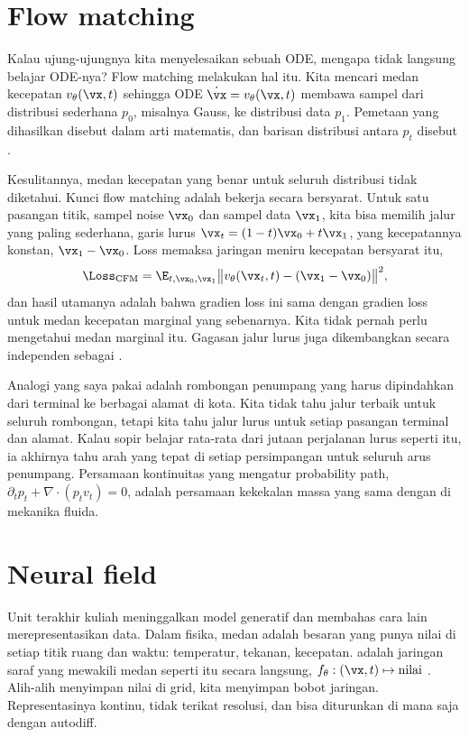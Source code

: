 \section{Flow matching}

Kalau ujung-ujungnya kita menyelesaikan sebuah ODE, mengapa tidak langsung belajar ODE-nya?
Flow matching \citep{lipman2023} melakukan hal itu. Kita mencari medan kecepatan $v_\theta(\vx,t)$
sehingga ODE $\dot{\vx}=v_\theta(\vx,t)$ membawa sampel dari distribusi sederhana $p_0$, misalnya
Gauss, ke distribusi data $p_1$. Pemetaan yang dihasilkan disebut  dalam arti
matematis, dan barisan distribusi antara $p_t$ disebut .

Kesulitannya, medan kecepatan yang benar untuk seluruh distribusi tidak diketahui. Kunci flow
matching adalah bekerja secara bersyarat. Untuk satu pasangan titik, sampel noise $\vx_0$ dan sampel
data $\vx_1$, kita bisa memilih jalur yang paling sederhana, garis lurus
$\vx_t=(1-t)\vx_0+t\vx_1$, yang kecepatannya konstan, $\vx_1-\vx_0$. Loss  memaksa jaringan meniru kecepatan bersyarat itu,
\begin{equation}
\Loss_{\mathrm{CFM}}=\E_{t,\vx_0,\vx_1}\big\|v_\theta(\vx_t,t)-(\vx_1-\vx_0)\big\|^2,
\end{equation}
dan hasil utamanya adalah bahwa gradien loss ini sama dengan gradien loss untuk medan kecepatan
marginal yang sebenarnya. Kita tidak pernah perlu mengetahui medan marginal itu. Gagasan jalur lurus
juga dikembangkan secara independen sebagai  \citep{liu2023}.

Analogi yang saya pakai adalah rombongan penumpang yang harus dipindahkan dari terminal ke berbagai
alamat di kota. Kita tidak tahu jalur terbaik untuk seluruh rombongan, tetapi kita tahu jalur lurus
untuk setiap pasangan terminal dan alamat. Kalau sopir belajar rata-rata dari jutaan perjalanan
lurus seperti itu, ia akhirnya tahu arah yang tepat di setiap persimpangan untuk seluruh arus
penumpang. Persamaan kontinuitas yang mengatur probability path, $\partial_tp_t+\nabla\cdot(p_tv_t)=0$,
adalah persamaan kekekalan massa yang sama dengan di mekanika fluida.

\section{Neural field}

Unit terakhir kuliah meninggalkan model generatif dan membahas cara lain merepresentasikan data.
Dalam fisika, medan adalah besaran yang punya nilai di setiap titik ruang dan waktu: temperatur,
tekanan, kecepatan.  adalah jaringan saraf yang mewakili medan seperti itu
secara langsung, $f_\theta:(\vx,t)\mapsto\text{nilai}$ \citep{xie2022}. Alih-alih menyimpan nilai di
grid, kita menyimpan bobot jaringan. Representasinya kontinu, tidak terikat resolusi, dan bisa
diturunkan di mana saja dengan autodiff.


